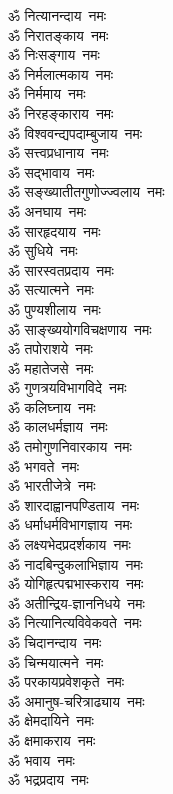 \begin{multicols}{2}
\begin{flushleft}
        ॐ नित्यानन्दाय~नमः\\
        ॐ निरातङ्काय~नमः\\
        ॐ निःसङ्गाय~नमः\\
        ॐ निर्मलात्मकाय~नमः\\
        ॐ निर्ममाय~नमः\\
        ॐ निरहङ्काराय~नमः\\
        ॐ विश्ववन्द्यपदाम्बुजाय~नमः\\
        ॐ सत्त्वप्रधानाय~नमः\\
        ॐ सद्भावाय~नमः\\
        ॐ सङ्ख्यातीत\-गुणोज्ज्वलाय~नमः\hfill{}\\
                                        
        ॐ अनघाय~नमः\\
        ॐ सारहृदयाय~नमः\\
        ॐ सुधिये~नमः\\
        ॐ सारस्वतप्रदाय~नमः\\
        ॐ सत्यात्मने~नमः\\
        ॐ पुण्यशीलाय~नमः\\
        ॐ साङ्ख्ययोगविचक्षणाय~नमः\\
        ॐ तपोराशये~नमः\\
        ॐ महातेजसे~नमः\\
        ॐ गुणत्रयविभागविदे~नमः\hfill{}\\
                                        
        ॐ कलिघ्नाय~नमः\\
        ॐ कालधर्मज्ञाय~नमः\\
        ॐ तमोगुणनिवारकाय~नमः\\
        ॐ भगवते~नमः\\
        ॐ भारतीजेत्रे~नमः\\
        ॐ शारदाह्वानपण्डिताय~नमः\\
        ॐ धर्माधर्मविभागज्ञाय~नमः\\
        ॐ लक्ष्यभेदप्रदर्शकाय~नमः\\
        ॐ नादबिन्दुकलाभिज्ञाय~नमः\\
        ॐ योगिहृत्पद्मभास्कराय~नमः\hfill{}\\
                                        
        ॐ अतीन्द्रिय-ज्ञाननिधये~नमः\\
        ॐ नित्यानित्यविवेकवते~नमः\\
        ॐ चिदानन्दाय~नमः\\
        ॐ चिन्मयात्मने~नमः\\
        ॐ परकायप्रवेशकृते~नमः\\
        ॐ अमानुष-चरित्राढ्याय~नमः\\
        ॐ क्षेमदायिने~नमः\\
        ॐ क्षमाकराय~नमः\\
        ॐ भवाय~नमः\\
        ॐ भद्रप्रदाय~नमः\hfill{}\\
                                        

\end{flushleft}
\end{multicols}
